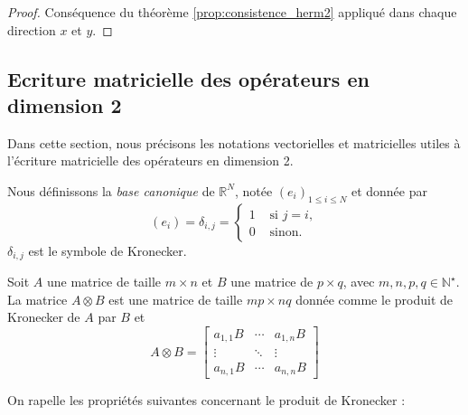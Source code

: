 \begin{proof}
Conséquence du théorème \ref{prop:consistence_herm2} appliqué dans chaque direction $x$ et $y$.
\end{proof}













\subsection{Ecriture matricielle des opérateurs en dimension 2}

Dans cette section, nous précisons les notations vectorielles et matricielles utiles à l'écriture matricielle des opérateurs en dimension 2.

Nous définissons la \textit{base canonique} de $\mathbb{R}^N$, notée $\left(e_i \right)_{1 \leq i \leq N}$ et donnée par 
\begin{equation}
\left( e_i \right) = \delta_{i,j} = \left\lbrace
\begin{array}{rl}
1 & \text{ si } j=i,\\
0 & \text{ sinon.}
\end{array}
\right.
\end{equation}
$\delta_{i,j}$ est le symbole de Kronecker.

\begin{definition}
Soit $A$ une matrice de taille $m \times n$ et $B$ une matrice de $p \times q$, avec $m, n, p, q \in \mathbb{N}^{\star}$. La matrice $A \otimes B$ est une matrice de taille $mp \times nq$ donnée comme le produit de Kronecker de $A$ par $B$ et 
\begin{equation}
A \otimes B = 
\begin{bmatrix}
a_{1,1}B & \cdots & a_{1,n}B \\ 
\vdots & \ddots & \vdots \\ 
a_{n,1}B & \cdots & a_{n,n}B
\end{bmatrix} 
\end{equation}
\end{definition}
On rapelle les propriétés suivantes concernant le produit de Kronecker :

